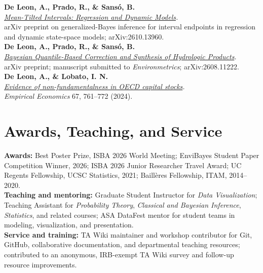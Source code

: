\documentclass[10pt,letterpaper]{article}
\newcommand{\cvsection}[1]{%
  \Needspace{4\baselineskip}%
  \section*{#1}%
}
\newcommand{\publication}[3]{%
  \Needspace{3\baselineskip}%
  \textbf{#1}\\
  \textit{#2}\\
  #3\\[1pt]
}
\begin{document}
\publication{De Leon, A., Prado, R., \& Sans\'o, B.}{\href{https://arxiv.org/abs/2610.13960}{Mean-Tilted Intervals: Regression and Dynamic Models}.}{arXiv preprint on generalized-Bayes inference for interval endpoints in regression and dynamic state-space models; arXiv:2610.13960.}

\publication{De Leon, A., Prado, R., \& Sans\'o, B.}{\href{https://arxiv.org/abs/2608.11222}{Bayesian Quantile-Based Correction and Synthesis of Hydrologic Products}.}{arXiv preprint; manuscript submitted to \textit{Environmetrics}; arXiv:2608.11222.}

\publication{De Leon, A., \& Lobato, I. N.}{\href{https://doi.org/10.1007/s00181-024-02564-5}{Evidence of non-fundamentalness in OECD capital stocks}.}{\textit{Empirical Economics} 67, 761--772 (2024).}

\cvsection{Awards, Teaching, and Service}
\textbf{Awards:} Best Poster Prize, ISBA 2026 World Meeting; EnviBayes Student Paper Competition Winner, 2026; ISBA 2026 Junior Researcher Travel Award; UC Regents Fellowship, UCSC Statistics, 2021; Baill\`eres Fellowship, ITAM, 2014--2020.\\[1pt]
\textbf{Teaching and mentoring:} Graduate Student Instructor for \textit{Data Visualization}; Teaching Assistant for \textit{Probability Theory}, \textit{Classical and Bayesian Inference}, \textit{Statistics}, and related courses; ASA DataFest mentor for student teams in modeling, visualization, and presentation.\\[1pt]
\textbf{Service and training:} TA Wiki maintainer and workshop contributor for Git, GitHub, collaborative documentation, and departmental teaching resources; contributed to an anonymous, IRB-exempt TA Wiki survey and follow-up resource improvements.
\end{document}
